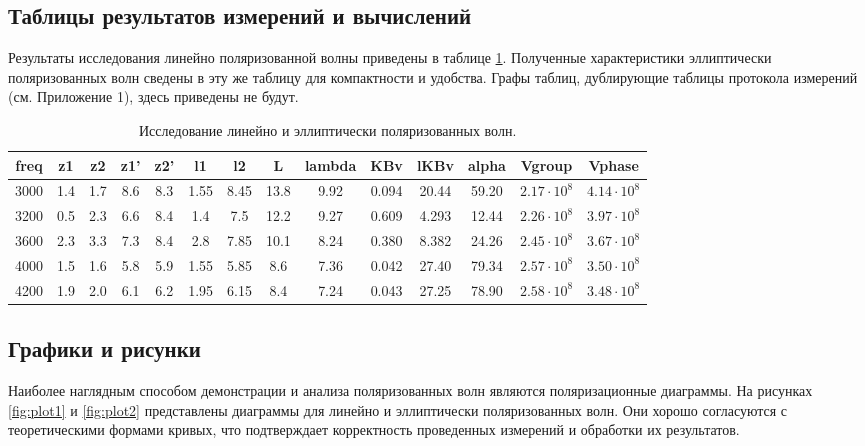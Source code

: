 \documentclass[11pt,a4paper,oneside, reqno]{amsproc}
\begin{document}
\subsection{Таблицы результатов измерений и вычислений}
Результаты исследования линейно поляризованной волны приведены в таблице
\ref{tab:tab1}. Полученные характеристики эллиптически поляризованных
волн сведены в эту же таблицу для компактности и удобства.
Графы таблиц, дублирующие таблицы протокола измерений (см. Приложение 1),
здесь приведены не будут.
\begin{centering}
\begin{table}[h!]
\vspace{10pt}
\begin{tabular}{cccccccccccccc} \toprule %
\newcolumntype{W}{D{.}{.}{2.3}}
freq  &  z1   &  z2   &  z1'  &  z2'  &  l1    &  l2    &  L     &  lambda   &  KBv        &  lKBv     &  alpha    &  Vgroup    &  Vphase    \\
 \midrule
3000  &  1.4  &  1.7  &  8.6  &  8.3  &  1.55  &  8.45  &  13.8  &  9.92  &  0.094  &  20.44  &  59.20  &  $2.17\cdot10^8$  &  $4.14\cdot10^8$  \\
3200  &  0.5  &  2.3  &  6.6  &  8.4  &  1.4   &  7.5   &  12.2  &  9.27  &  0.609  &  4.293   &  12.44  &  $2.26\cdot10^8$  &  $3.97\cdot10^8$  \\
3600  &  2.3  &  3.3  &  7.3  &  8.4  &  2.8   &  7.85  &  10.1  &  8.24  &  0.380  &  8.382  &  24.26  &  $2.45\cdot10^8$  &  $3.67\cdot10^8$  \\
4000  &  1.5  &  1.6  &  5.8  &  5.9  &  1.55  &  5.85  &  8.6   &  7.36  &  0.042  &  27.40  &  79.34  &  $2.57\cdot10^8$  &  $3.50\cdot10^8$  \\
4200  &  1.9  &  2.0  &  6.1  &  6.2  &  1.95  &  6.15  &  8.4   &  7.24  &  0.043  &  27.25  &  78.90  &  $2.58\cdot10^8$  &  $3.48\cdot10^8$  \\
\bottomrule
\end{tabular}
\vspace{5 pt}
\caption{Исследование линейно и эллиптически поляризованных волн.} 
\label{tab:tab1}
\end{table}
\end{centering}

\subsection{Графики и рисунки}
Наиболее наглядным способом демонстрации и анализа поляризованных волн являются
поляризационные диаграммы. На рисунках \ref{fig:plot1} и \ref{fig:plot2}
представлены диаграммы для линейно и эллиптически поляризованных волн.
Они хорошо согласуются с теоретическими формами кривых, что
подтверждает корректность проведенных измерений и обработки их результатов.\\
\end{document}
